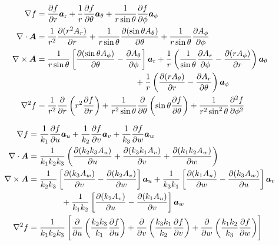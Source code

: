 \begin{align*}
\nabla f &=\frac{\partial f}{\partial r}{\boldsymbol{a}}_{\textup{r}}+\frac{1}{r}\frac{\partial f}{\partial \theta}{\boldsymbol{a}}_{\theta}+\frac{1}{r \sin \theta}\frac{\partial f}{\partial \phi}{\boldsymbol{a}}_{\phi}\\
\nabla \cdot {\ensuremath{{\boldsymbol{A}}}}&=\frac{1}{r^2}\frac{\partial (r^2 A_r)}{\partial r}+\frac{1}{r \sin \theta }\frac{\partial ( \sin \theta A_{\theta})}{\partial \theta}+\frac{1}{r \sin \theta}\frac{\partial A_{\phi}}{\partial \phi}\\
\nabla \times {\ensuremath{{\boldsymbol{A}}}}&=\frac{1}{r \sin \theta}\left[\frac{\partial (\sin \theta A_{\phi})}{\partial \theta}-\frac{\partial A_{\theta}}{\partial \phi} \right]{\boldsymbol{a}}_{\textup{r}}+\frac{1}{r}\left(\frac{1}{\sin \theta}\frac{\partial A_r}{\partial \phi}-\frac{\partial (r A_{\phi})}{\partial r} \right){\boldsymbol{a}}_{\theta}\\
& \quad \quad \quad\quad \quad \quad\quad \quad \quad\quad \quad \quad +\frac{1}{r}\left(\frac{\partial (r A_{\theta})}{\partial r}-\frac{\partial A_r}{\partial \theta} \right){\boldsymbol{a}}_{\phi} \\
\nabla^2 f &=\frac{1}{r^2}\frac{\partial}{\partial r}\left(r^2 \frac{\partial f}{\partial r} \right)+\frac{1}{r^2 \sin \theta}\frac{\partial}{\partial \theta}\left(\sin \theta \frac{\partial f}{\partial \theta} \right)+\frac{1}{r^2 \sin^2 \theta}\frac{\partial^2  f}{\partial {\phi}^2}
\end{align*}


\begin{align*}
\nabla f &=\frac{1}{k_1}\frac{\partial f}{\partial u}{\boldsymbol{a}}_u+\frac{1}{k_2}\frac{\partial f}{\partial v}{\boldsymbol{a}}_v+\frac{1}{k_3}\frac{\partial f}{\partial w}{\boldsymbol{a}}_w\\
\nabla \cdot {\ensuremath{{\boldsymbol{A}}}}&=\frac{1}{k_1 k_2 k_3}\left(\frac{\partial (k_2 k_3 A_u)}{\partial u}+\frac{\partial ( k_3 k_1 A_v)}{\partial v}+\frac{\partial (k_1 k_2 A_w)}{\partial w}\right)\\
\nabla \times {\ensuremath{{\boldsymbol{A}}}}&=\frac{1}{k_2 k_3}\left[\frac{\partial (k_3 A_w)}{\partial v}-\frac{\partial (k_2 A_v)}{\partial w} \right]{\boldsymbol{a}}_u+\frac{1}{k_3 k_1}\left[\frac{\partial (k_1 A_u)}{\partial w}-\frac{\partial (k_3 A_w)}{\partial u} \right]{\boldsymbol{a}}_v\\
& \quad \quad \quad \quad +\frac{1}{k_1 k_2}\left[\frac{\partial (k_2 A_v)}{\partial u}-\frac{\partial (k_1 A_u)}{\partial v} \right]{\boldsymbol{a}}_w \\
\nabla^2 f &=\frac{1}{k_1 k_2 k_3} \left[\frac{\partial}{\partial u}\left(\frac{k_2 k_3}{k_1}\frac{\partial f}{\partial u} \right)+\frac{\partial}{\partial v}\left(\frac{k_3 k_1}{k_2}\frac{\partial f}{\partial v} \right)+\frac{\partial}{\partial w}\left(\frac{k_1 k_2}{k_3}\frac{\partial f}{\partial w} \right)\right]
\end{align*}

